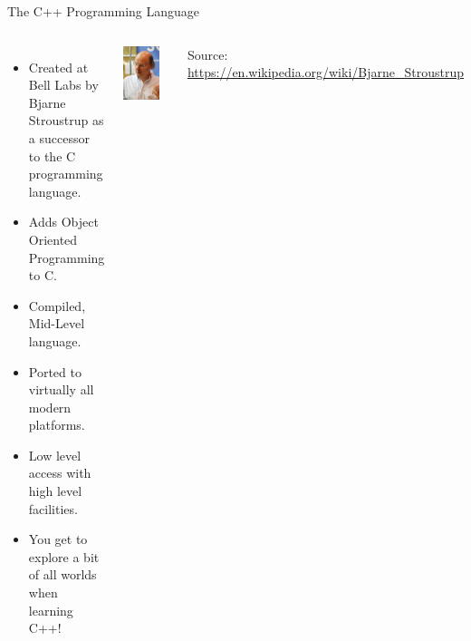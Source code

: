 \documentclass{beamer}
\begin{document}
\begin{frame}{The C++ Programming Language}
    \begin{columns}
        \begin{itemize}[<+(1)->]
            \item Created at Bell Labs by Bjarne Stroustrup as
                a successor to the C programming language.
            \item Adds Object Oriented Programming to C.
            \item Compiled, Mid-Level language.
            \item Ported to virtually all modern platforms.
            \item Low level access with high level facilities.
            \item You get to explore a bit of all worlds when learning
                C++!
        \end{itemize}

        \includegraphics[width=0.8\textwidth]{images/bjarne}
        \begin{center}
            \tiny
            Source: \url{https://en.wikipedia.org/wiki/Bjarne_Stroustrup}
        \end{center}
    \end{columns}
\end{frame}
\end{document}
